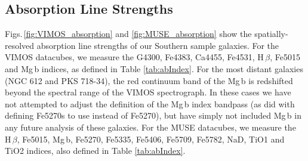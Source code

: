 	\subsection{Absorption Line Strengths}
		\label{subsec:absorption}

		Figs.\,\ref{fig:VIMOS_absorption} and \ref{fig:MUSE_absorption} show the spatially-resolved absorption line strengths of our Southern sample galaxies. For the VIMOS datacubes, we measure the G4300, Fe4383, Ca4455, Fe4531, H\,$\beta$, Fe5015 and Mg\,b indices, as defined in Table \ref{tab:abIndex}. For the most distant galaxies (NGC 612 and PKS 718-34), the red continuum band of the Mg\,b is redshifted beyond the spectral range of the VIMOS spectrograph. In these cases we have not attempted to adjust the definition of the Mg\,b index bandpass (as \citealt{Kuntschner2006} did with defining Fe5270s to use instead of Fe5270), but have simply not included Mg\,b in any future analysis of these galaxies. For the MUSE datacubes, we measure the H\,$\beta$, Fe5015, Mg\,b, Fe5270, Fe5335, Fe5406, Fe5709, Fe5782, NaD, TiO1 and TiO2 indices, also defined in Table \ref{tab:abIndex}.

